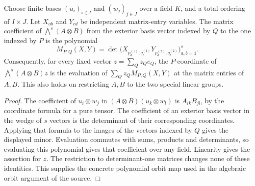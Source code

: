 \begin{lemma}
\label{lem:balanced-plucker-coordinates}
\leanok
Choose finite bases $(u_i)_{i\in I}$ and $(w_j)_{j\in J}$ over a field $K$,
and a total ordering of $I\times J$. Let $X_{ab}$ and $Y_{cd}$ be independent
matrix-entry variables. The matrix coefficient of
$\bigwedge^s(A\otimes B)$ from the exterior basis vector indexed by
$Q$ to the one indexed by $P$ is the polynomial
\[
 M_{P,Q}(X,Y)=\det\bigl(X_{p_a^{(1)},q_b^{(1)}}
                                  Y_{p_a^{(2)},q_b^{(2)}}\bigr)_{a,b=1}^s.
\]
Consequently, for every fixed vector $z=\sum_Q z_Q e_Q$, the $P$-coordinate
of $\bigwedge^s(A\otimes B)z$ is the evaluation of
$\sum_Q z_Q M_{P,Q}(X,Y)$ at the matrix entries of $A,B$.
This also holds on restricting $A,B$ to the two special linear groups.
\end{lemma}
\begin{proof}
The coefficient of $u_i\otimes w_j$ in
$(A\otimes B)(u_k\otimes w_l)$ is $A_{ik}B_{jl}$, by the coordinate
formula for a pure tensor. The coefficient of an exterior basis vector in
the wedge of $s$ vectors is the determinant of their corresponding
coordinates. Applying that formula to the images of the vectors indexed
by $Q$ gives the displayed minor. Evaluation commutes with sums, products
and determinants, so evaluating this polynomial gives that coefficient
over any field. Linearity gives the assertion for $z$. The restriction
to determinant-one matrices changes none of these identities.
This supplies the concrete polynomial orbit map used in the algebraic
orbit argument of the source.
\end{proof}

